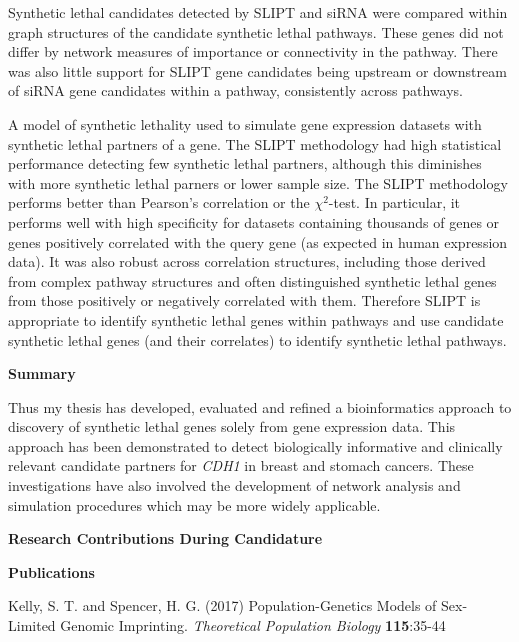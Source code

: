 Synthetic lethal candidates detected by \acrshort{SLIPT} and \acrshort{siRNA} were compared within graph structures of the candidate synthetic lethal pathways. These genes did not differ by network measures of importance or connectivity in the pathway. There was also little support for \acrshort{SLIPT} gene candidates being upstream or downstream of \acrshort{siRNA} gene candidates within a pathway, consistently across pathways. 


A model of synthetic lethality used to simulate gene expression datasets with synthetic lethal partners of a gene. The \acrshort{SLIPT} methodology had high statistical performance detecting few synthetic lethal partners, although this diminishes with more synthetic lethal parners or lower sample size. The \acrshort{SLIPT} methodology performs better than Pearson's correlation or the $\chi^2$-test. In particular, it performs well with high specificity for datasets containing thousands of genes or genes positively correlated with the query gene (as expected in human expression data). It was also robust across correlation structures, including those derived from complex pathway structures and often distinguished synthetic lethal genes from those positively or negatively correlated with them. Therefore \acrshort{SLIPT} is appropriate to identify synthetic lethal genes within pathways and use candidate synthetic lethal genes (and their correlates) to identify synthetic lethal pathways.

\clearpage
\textbf{Summary}

Thus my thesis has developed, evaluated and refined a bioinformatics approach to discovery of synthetic lethal genes solely from gene expression data. This approach has been demonstrated to detect biologically informative and clinically relevant candidate partners for \textit{CDH1} in breast and stomach cancers. These investigations have also involved the development of network analysis and simulation procedures which may be more widely applicable.

\clearpage

\begin{center}
 \textbf{Research Contributions During Candidature}
\end{center}

\textbf{Publications}

\begin{small} \begin{flushleft} Kelly, S. T. and Spencer, H. G. (2017) Population-Genetics Models of Sex-Limited Genomic Imprinting. \textit{Theoretical Population Biology} \textbf{115}:35-44  \end{flushleft} \end{small}

